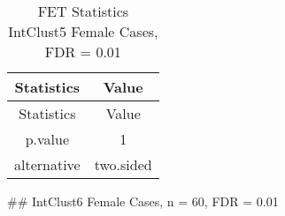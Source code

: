\documentclass[]{article}
\begin{document}
\begin{longtable}[]{@{}cc@{}}
\caption{FET Statistics IntClust5 Female Cases, FDR =
0.01}\tabularnewline
\toprule
\begin{minipage}[b]{0.18\columnwidth}\centering\strut
Statistics\strut
\end{minipage} & \begin{minipage}[b]{0.14\columnwidth}\centering\strut
Value\strut
\end{minipage}\tabularnewline
\midrule
\endfirsthead
\toprule
\begin{minipage}[b]{0.18\columnwidth}\centering\strut
Statistics\strut
\end{minipage} & \begin{minipage}[b]{0.14\columnwidth}\centering\strut
Value\strut
\end{minipage}\tabularnewline
\midrule
\endhead
\begin{minipage}[t]{0.18\columnwidth}\centering\strut
p.value\strut
\end{minipage} & \begin{minipage}[t]{0.14\columnwidth}\centering\strut
1\strut
\end{minipage}\tabularnewline
\begin{minipage}[t]{0.18\columnwidth}\centering\strut
alternative\strut
\end{minipage} & \begin{minipage}[t]{0.14\columnwidth}\centering\strut
two.sided\strut
\end{minipage}\tabularnewline
\bottomrule
\end{longtable}

\pagebreak
\#\# IntClust6 Female Cases, n = 60, FDR = 0.01
\end{document}

